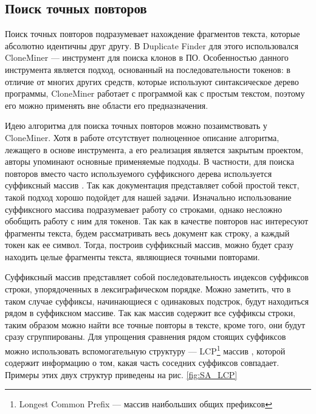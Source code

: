 \documentclass[14pt]{matmex-diploma-custom}
\begin{document}
\subsection{Поиск точных повторов}

Поиск точных повторов подразумевает нахождение фрагментов текста, которые абсолютно идентичны друг другу. В Duplicate Finder для этого использовался CloneMiner\cite{bib:tool:CloneMiner} --- инструмент для поиска клонов в ПО. Особенностью данного инструмента является подход, основанный на последовательности токенов: в отличие от многих других средств, которые используют синтаксическое дерево программы\cite{bib:tool:ASTSearch}, CloneMiner работает с программой как с простым текстом, поэтому его можно применять вне области его предназначения.

Идею алгоритма для поиска точных повторов можно позаимствовать у CloneMiner. Хотя в работе \cite{bib:tool:CloneMiner} отсутствует полноценное описание алгоритма, лежащего в основе инструмента, а его реализация является закрытым проектом, авторы упоминают основные применяемые подходы. В частности, для поиска повторов вместо часто используемого суффиксного дерева \cite{bib:art:SuffixTree} используется суффиксный массив \cite{bib:art:SuffixArray}. Так как документация представляет собой простой текст, такой подход хорошо подойдет для нашей задачи. Изначально использование суффиксного массива подразумевает работу со строками, однако несложно обобщить работу с ним для токенов. Так как в качестве повторов нас интересуют фрагменты текста, будем рассматривать весь документ как строку, а каждый токен как ее символ. Тогда, построив суффиксный массив, можно будет сразу находить целые фрагменты текста, являющиеся точными повторами.

Суффиксный массив представляет собой последовательность индексов суффиксов строки, упорядоченных в лексиграфическом порядке. Можно заметить, что в таком случае суффиксы, начинающиеся с одинаковых подстрок, будут находиться рядом в суффиксном массиве. Так как массив содержит все суффиксы строки, таким образом можно найти все точные повторы в тексте, кроме того, они будут сразу сгруппированы. Для упрощения сравнения рядом стоящих суффиксов можно использовать вспомогательную структуру --- LCP\footnote{Longest Common Prefix --- массив наибольших общих префиксов} массив \cite{bib:art:LCPArray}, которой содержит информацию о том, какая часть соседних суффиксов совпадает. Примеры этих двух структур приведены на рис. \ref{fig:SA_LCP}
\end{document}
